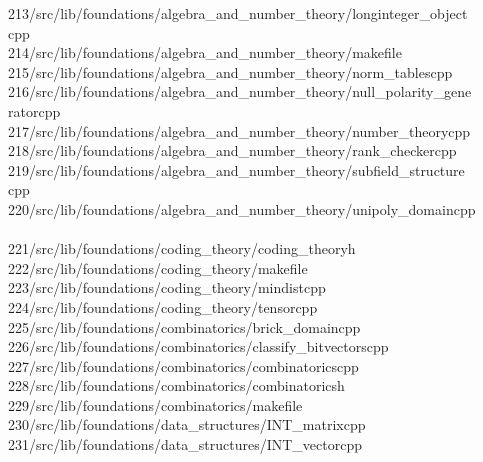 \begin{tabbing}
213\>/src/lib/foundations/algebra\_and\_number\_theory/longinteger\_object\\[0pt]
\>cpp\\[0pt]
214\>/src/lib/foundations/algebra\_and\_number\_theory/makefile\\[0pt]
215\>/src/lib/foundations/algebra\_and\_number\_theory/norm\_tablescpp\\[0pt]
216\>/src/lib/foundations/algebra\_and\_number\_theory/null\_polarity\_gene\\[0pt]
\>ratorcpp\\[0pt]
217\>/src/lib/foundations/algebra\_and\_number\_theory/number\_theorycpp\\[0pt]
218\>/src/lib/foundations/algebra\_and\_number\_theory/rank\_checkercpp\\[0pt]
219\>/src/lib/foundations/algebra\_and\_number\_theory/subfield\_structure\\[0pt]
\>cpp\\[0pt]
220\>/src/lib/foundations/algebra\_and\_number\_theory/unipoly\_domaincpp\\[0pt]
\>\\[0pt]
221\>/src/lib/foundations/coding\_theory/coding\_theoryh\\[0pt]
222\>/src/lib/foundations/coding\_theory/makefile\\[0pt]
223\>/src/lib/foundations/coding\_theory/mindistcpp\\[0pt]
224\>/src/lib/foundations/coding\_theory/tensorcpp\\[0pt]
225\>/src/lib/foundations/combinatorics/brick\_domaincpp\\[0pt]
226\>/src/lib/foundations/combinatorics/classify\_bitvectorscpp\\[0pt]
227\>/src/lib/foundations/combinatorics/combinatoricscpp\\[0pt]
228\>/src/lib/foundations/combinatorics/combinatoricsh\\[0pt]
229\>/src/lib/foundations/combinatorics/makefile\\[0pt]
230\>/src/lib/foundations/data\_structures/INT\_matrixcpp\\[0pt]
231\>/src/lib/foundations/data\_structures/INT\_vectorcpp\\[0pt]

\end{tabbing}
